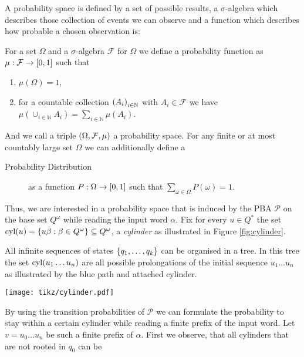 A probability space is defined by a set of possible results, a $\sigma$-algebra
which describes those collection of events we can observe and a function which
describes how probable a chosen observation is:
\begin{definition}
  For a set $\Omega$ and a $\sigma$-algebra $\mathcal{F}$ for $\Omega$ we
  define a probability function as $\mu:\mathcal{F}\rightarrow\left[0,1\right]$
  such that
  \begin{enumerate}
    \item $\mu(\Omega) = 1$,
    \item for a countable collection $\left(A_{i}\right)_{i\in\mathbb{N}}$ with
      $A_{i}\in\mathcal{F}$ we have $\mu(\cup_{i\in\mathbb{N}}A_{i}) =
      \sum_{i\in\mathbb{N}}\mu(A_{i})$.
  \end{enumerate}
  And we call a triple $\left(\Omega,\mathcal{F},\mu\right)$ a probability space.
  For any finite or at most countably large set $\Omega$ we can additionally
  define a
  \begin{description}
    \item [Probability Distribution] as a function
      $P:\Omega\rightarrow\left[0,1\right]$ such that
      $\sum_{\omega\in\Omega}P(\omega) = 1$. 
  \end{description}
\end{definition}
Thus, we are interested in a probability space that is induced by the \ac{PBA}
$\mathcal{P}$ on the base set $Q^{\omega}$ while reading the input word 
$\alpha$. Fix for every $u\in Q^{*}$ the set 
$\operatorname{cyl}(u) = \left\{u\beta : \beta\in Q^{\omega}\right\}\subseteq Q^{\omega}$, a 
\emph{cylinder} as illustrated in Figure \ref{fig:cylinder}.
\begin{drawing}
  \caption{All infinite sequences of states $\left\{q_{1},\dots, q_{k}\right\}$ can be
  organised in a tree. In this tree the set $\operatorname{cyl}(u_{1}\dots u_{n})$ are all 
  possible prolongations of the initial sequence $u_{1}\dots u_{n}$ as 
  illustrated by the blue path and attached cylinder.}
  \label{fig:cylinder}
  \begin{center}
    \texttt{[image: tikz/cylinder.pdf]}
  \end{center}
\end{drawing}
By using the transition probabilities of $\mathcal{P}$ we can formulate the 
probability to stay within a certain cylinder while reading a finite prefix of 
the input word. Let $v = u_{0}\dots u_{n}$ be such a finite prefix of $\alpha$.
First we observe, that all cylinders that are not rooted in $q_{0}$ can be 
